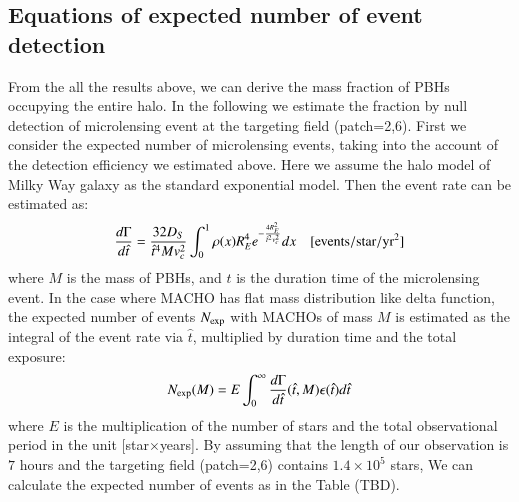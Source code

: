 \documentclass[iop, apj]{emulateapj}
\newcommand{\?}{\stackrel{?}{=}}
\begin{document}
\subsection{Equations of expected number of event detection} %
\label{sec:constraint}
From the all the results above, 
we can derive the mass fraction of PBHs occupying the entire halo. 
In the following we estimate the fraction by null detection of microlensing event at the targeting field (patch=2,6). 
First we consider the expected number of microlensing events, taking into 
the account of the detection efficiency we estimated above.
Here we assume the halo model of Milky Way galaxy as the standard exponential model. %
Then the event rate can be estimated as:
%
\begin{eqnarray}
\frac{d\Gamma}{d\hat t}=\frac{32D_S}{\hat t^4 Mv_c^2}\int^1_0 \rho(x) R^4_E e^{-\frac{4R^2_E}{\hat t^2 v^2_c}} dx \quad[\rm {events/star/yr^2}]\nonumber
\end{eqnarray}
%
where $M$ is the mass of PBHs, and $\hat t$ is the duration time of the microlensing event. 
%
%
In the case where MACHO has flat mass distribution like delta function, 
the expected number of events $N_{\rm exp}$ with MACHOs of mass $M$ is estimated as
the integral of the event rate via $\hat t$, 
multiplied by duration time and the total exposure:
%
\begin{eqnarray}
N_{\rm exp}(M)=E\int^{\infty}_0 \frac{d\Gamma}{d\hat t}(\hat t,M)\epsilon(\hat t)d\hat t
\end{eqnarray}
%
where $E$ is the multiplication of the number of stars and the total observational period in the unit [star$\times$years]. 
By assuming that the length of our observation is $7$ hours and the targeting field (patch=2,6) contains $1.4\times10^5$ stars, 
We can calculate the expected number of events as in the Table (TBD). %
\end{document}

